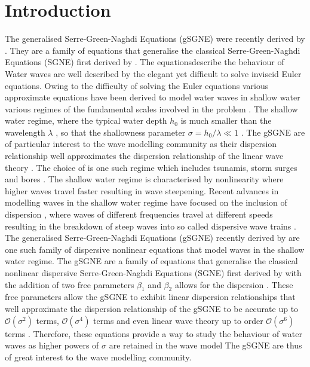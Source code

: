 \documentclass[10pt]{elsarticle}
\providecommand{\DIFaddtex}[1]{{\protect\color{blue} \sf #1}} %
\providecommand{\DIFdeltex}[1]{{\protect\color{red} \scriptsize #1}} %
\providecommand{\DIFaddbegin}{} %
\providecommand{\DIFaddend}{} %
\providecommand{\DIFdelbegin}{} %
\providecommand{\DIFdelend}{} %
\providecommand{\DIFadd}[1]{\texorpdfstring{\DIFaddtex{#1}}{#1}} %
\providecommand{\DIFdel}[1]{\texorpdfstring{\DIFdeltex{#1}}{}} %
\newcommand{\DIFscaledelfig}{0.5}
\newlength{\DIFdelgraphicswidth} %
\newlength{\DIFdelgraphicsheight} %
\newcommand{\DIFaddincludegraphics}[2][]{{\color{blue}\fbox{\DIFOincludegraphics[#1]{#2}}}} %
\newcommand{\DIFdelincludegraphics}[2][]{%
\sbox{\DIFdelgraphicsbox}{\DIFOincludegraphics[#1]{#2}}%
\settoboxwidth{\DIFdelgraphicswidth}{\DIFdelgraphicsbox} %
\settoboxtotalheight{\DIFdelgraphicsheight}{\DIFdelgraphicsbox} %
\scalebox{\DIFscaledelfig}{%
\parbox[b]{\DIFdelgraphicswidth}{\usebox{\DIFdelgraphicsbox}\\[-\baselineskip] \rule{\DIFdelgraphicswidth}{0em}}\llap{\resizebox{\DIFdelgraphicswidth}{\DIFdelgraphicsheight}{%
\setlength{\unitlength}{\DIFdelgraphicswidth}%
\begin{picture}(1,1)%
\thicklines\linethickness{2pt} %
{\color[rgb]{1,0,0}\put(0,0){\framebox(1,1){}}}%
{\color[rgb]{1,0,0}\put(0,0){\line( 1,1){1}}}%
{\color[rgb]{1,0,0}\put(0,1){\line(1,-1){1}}}%
\end{picture}%
}\hspace*{3pt}}} %
} %
\DeclareRobustCommand{\DIFaddbegin}{\DIFOaddbegin \let\includegraphics\DIFaddincludegraphics} %
\DeclareRobustCommand{\DIFaddend}{\DIFOaddend \let\includegraphics\DIFOincludegraphics} %
\DeclareRobustCommand{\DIFdelbegin}{\DIFOdelbegin \let\includegraphics\DIFdelincludegraphics} %
\DeclareRobustCommand{\DIFdelend}{\DIFOaddend \let\includegraphics\DIFOincludegraphics} %
\begin{document}
\section{Introduction}
\DIFdelbegin \DIFdel{The generalised Serre-Green-Naghdi Equations (gSGNE) were recently derived by \citet{Clamond-Dutykh-2018-237}. They are a family of equations that generalise the classical Serre-Green-Naghdi Equations (SGNE) first derived by \citet{Serre-F-1953-857}. The equationsdescribe the behaviour of }\DIFdelend \DIFaddbegin \DIFadd{Water waves are well described by the elegant yet difficult to solve inviscid Euler equations. Owing to the difficulty of solving the Euler equations various approximate equations have been derived to model }\DIFaddend water waves in \DIFdelbegin \DIFdel{shallow water }\DIFdelend \DIFaddbegin \DIFadd{various regimes of the fundamental scales involved in the problem \cite{Mehaute-1976}. The shallow water regime, }\DIFaddend where the typical water depth $h_0$ is much smaller than the wavelength $\lambda$\DIFaddbegin \DIFadd{, }\DIFaddend so that the shallowness parameter $\sigma = h_0/\lambda \ll 1$ \DIFdelbegin \DIFdel{. The gSGNE are of particular interest to the wave modelling community as their dispersion relationship well approximates the dispersion relationship of the linear wave theory \cite{Whitham-1967-399}. The choice of }\DIFdelend \DIFaddbegin \DIFadd{is one such regime which includes tsunamis, storm surges and bores \cite{Sorenson-2006}. The shallow water regime is characterised by nonlinearity where higher waves travel faster resulting in wave steepening. Recent advances in modelling waves in the shallow water regime have focused on the inclusion of dispersion \cite{Kirby-etal-2013-39}, where waves of different frequencies travel at different speeds resulting in the breakdown of steep waves into so called dispersive wave trains \cite{El-etal-2006}. The generalised Serre-Green-Naghdi Equations (gSGNE) recently derived by \citet{Clamond-Dutykh-2018-237} are one such family of dispersive nonlinear equations that model waves in the shallow water regime. The gSGNE are a family of equations that generalise the classical nonlinear dispersive Serre-Green-Naghdi Equations (SGNE) first derived by \citet{Serre-F-1953-857} with the addition of }\DIFaddend two free parameters $\beta_1$ and $\beta_2$\DIFdelbegin \DIFdel{allows for the dispersion }\DIFdelend \DIFaddbegin \DIFadd{. These free parameters allow the gSGNE to exhibit linear dispersion relationships that well approximate the dispersion }\DIFaddend relationship of the \DIFdelbegin \DIFdel{gSGNE to be accurate up to $\mathcal{O}\left(\sigma^2\right)$ terms, $\mathcal{O}\left(\sigma^4\right)$ terms and even }\DIFdelend \DIFaddbegin \DIFadd{linear wave theory \cite{Whitham-1967-399} up to order }\DIFaddend $\mathcal{O}\left(\sigma^6\right)$ terms \cite{Clamond-Dutykh-2018-237,Clamond-et.al-2017-245}. \DIFdelbegin \DIFdel{Therefore, these equations provide a way to study the behaviour of water waves as higher powers of $\sigma$ are retained in the wave model}\DIFdelend \DIFaddbegin \DIFadd{The gSGNE are thus of great interest to the wave modelling community}\DIFaddend . 
\end{document}
